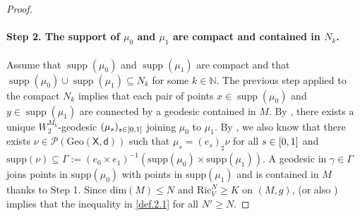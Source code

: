 \documentclass[11pt,twoside,a4paper]{article}
\DeclareMathOperator{\supp}{supp}
\newcommand{\N}{\mathbb{N}}
\newcommand{\X}{\mathsf{X}}
\newcommand{\di}
{\mathsf d} %
\theoremstyle{theorem}
\theoremstyle{definition}
\theoremstyle{remark}
\theoremstyle{proof}
\begin{document}
\begin{proof}
    \paragraph{Step 2. The support of $\mu_0$ and $\mu_1$ are compact and contained in $N_k$.}
    Assume that $\supp(\mu_0)$ and $\supp(\mu_1)$ are compact and that $\supp(\mu_0) \cup \supp(\mu_1) \subseteq N_k$ for some $k \in \N$. The previous step applied to the compact $N_k$ implies that each pair of points $x \in \supp(\mu_0)$ and $y \in \supp(\mu_1)$ are connected by a geodesic contained in $M$. By \cite[Theorem 13]{mccann}, there exists a unique $W_2^{M_k}$-geodesic $(\mu_s)_{s \in \interval{0}{1}}$ joining $\mu_0$ to $\mu_1$. By \cite[Proposition 2.10]{lott--villani2009}
    , we also know that there exists $\nu \in \mathscr{P}(\mathrm{Geo}(\X, \di))$ such that $\mu_s = (e_s)_\sharp \nu$ for all $s \in \interval{0}{1}$ and $\mathrm{supp}(\nu) \subseteq \Gamma := (e_0 \times e_1)^{-1}(\mathrm{supp}(\mu_0) \times \mathrm{supp}(\mu_1))$. A geodesic in $\gamma \in \Gamma$ joins points in $\mathrm{supp}(\mu_0)$ with points in $\mathrm{supp}(\mu_1)$ and is contained in $M$ thanks to Step 1. Since $\mathrm{dim}(M) \leq N$ and $\mathrm{Ric}_{V}^N \geq K$ on $(M, g)$, \cite[Theorem\, 17.36]{villani} (or also \cite[Parts (a), (b), (c), and (d) of the proof of Theorem 1.7]{sturm2006}) implies that the inequality in \cref{def.2.1} for all $N' \geq N$.

\end{proof}
\end{document}
